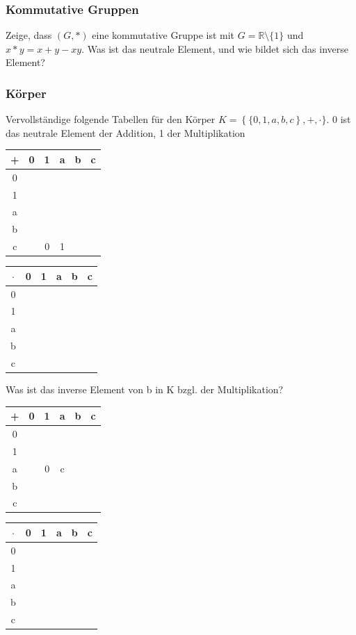 \documentclass[11pt, a4paper]{article}
\begin{document}
\subsubsection{Kommutative Gruppen}
Zeige, dass $(G,*)$ eine kommutative Gruppe ist mit $G=\mathbb{R} \setminus \{1\}$ und $x * y = x+y-xy$. Was ist das neutrale Element, und wie bildet sich das inverse Element?

\subsubsection{Körper}
Vervollständige folgende Tabellen für den Körper $K = \left\{\{0,1,a,b,c\right\}, +, \cdot\} $. 0 ist das neutrale Element der Addition, 1 der Multiplikation
\begin{center}
	\begin{tabular}{c|ccccc}
		+ & 0 & 1 & a & b & c \\ \hline
		0 &  &  &  &  & \\
		1 &  &  &  &  & \\
		a &  &  &  &  & \\
		b &  &  &  &  & \\
		c &  & 0 & 1 &  & \\
	\end{tabular}
	\hspace{2cm}
	\begin{tabular}{c|ccccc}
		$\cdot$ & 0 & 1 & a & b & c \\ \hline
		0 &  &  &  &  & \\
		1 &  &  &  &  & \\
		a &  &  &  &  & \\
		b &  &  &  &  & \\
		c &  &  &  &  & \\
	\end{tabular}
\end{center}
Was ist das inverse Element von b in K bzgl. der Multiplikation?

\begin{center}
	\begin{tabular}{c|ccccc}
		+ & 0 & 1 & a & b & c \\ \hline
		0 &  &  &  &  & \\
		1 &  &  &  &  & \\
		a &  & 0 & c &  & \\
		b &  &  &  &  & \\
		c &  &  &  &  & \\
	\end{tabular}
	\hspace{2cm}
	\begin{tabular}{c|ccccc}
		$\cdot$ & 0 & 1 & a & b & c \\ \hline
		0 &  &  &  &  & \\
		1 &  &  &  &  & \\
		a &  &  &  &  & \\
		b &  &  &  &  & \\
		c &  &  &  &  & \\
	\end{tabular}
\end{center}
\end{document}
